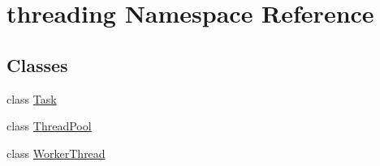 \hypertarget{namespacethreading}{\section{threading Namespace Reference}
\label{namespacethreading}
}
\subsection*{Classes}
\begin{DoxyCompactItemize}
\item 
class \hyperlink{classthreading_1_1Task}{Task}
\item 
class \hyperlink{classthreading_1_1ThreadPool}{Thread\-Pool}
\item 
class \hyperlink{classthreading_1_1WorkerThread}{Worker\-Thread}
\end{DoxyCompactItemize}
